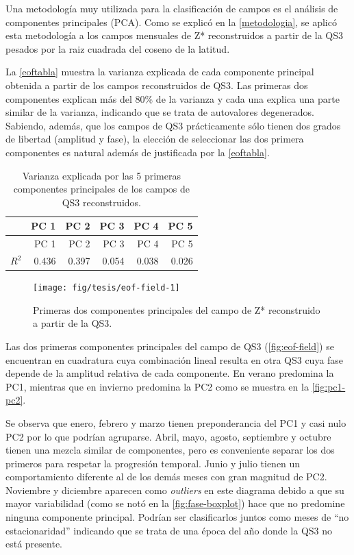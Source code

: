 \documentclass[spanish,a4paper,12pt,oneside]{book}
\begin{document}
Una metodología muy utilizada para la clasificación de campos es el
análisis de componentes principales (PCA). Como se explicó en la
\autoref{metodologia}, se aplicó esta metodología a los campos mensuales
de Z* reconstruidos a partir de la QS3 pesados por la raiz cuadrada del
coseno de la latitud.

La \autoref{eoftabla} muestra la varianza explicada de cada componente
principal obtenida a partir de los campos reconstruidos de QS3. Las
primeras dos componentes explican más del 80\% de la varianza y cada una
explica una parte similar de la varianza, indicando que se trata de
autovalores degenerados. Sabiendo, además, que los campos de QS3
prácticamente sólo tienen dos grados de libertad (amplitud y fase), la
elección de seleccionar las dos primera componentes es natural además de
justificada por la \autoref{eoftabla}.

\begin{longtable}[]{@{}lrrrrr@{}}
\caption{Varianza explicada por las 5 primeras componentes principales
de los campos de QS3 reconstruidos.\label{eoftabla}}\tabularnewline
\toprule
& PC 1 & PC 2 & PC 3 & PC 4 & PC 5\tabularnewline
\midrule
\endfirsthead
\toprule
& PC 1 & PC 2 & PC 3 & PC 4 & PC 5\tabularnewline
\midrule
\endhead
\(R^2\) & 0.436 & 0.397 & 0.054 & 0.038 & 0.026\tabularnewline
\bottomrule
\end{longtable}

\begin{figure}
\texttt{[image: fig/tesis/eof-field-1]} \caption{Primeras dos componentes principales del campo de Z* reconstruido a partir de la QS3.}\label{fig:eof-field}
\end{figure}

Las dos primeras componentes principales del campo de QS3
(\autoref{fig:eof-field}) se encuentran en cuadratura cuya combinación
lineal resulta en otra QS3 cuya fase depende de la amplitud relativa de
cada componente. En verano predomina la PC1, mientras que en invierno
predomina la PC2 como se muestra en la \autoref{fig:pc1-pc2}.

Se observa que enero, febrero y marzo tienen preponderancia del PC1 y
casi nulo PC2 por lo que podrían agruparse. Abril, mayo, agosto,
septiembre y octubre tienen una mezcla similar de componentes, pero es
conveniente separar los dos primeros para respetar la progresión
temporal. Junio y julio tienen un comportamiento diferente al de los
demás meses con gran magnitud de PC2. Noviembre y diciembre aparecen
como \emph{outliers} en este diagrama debido a que su mayor variabilidad
(como se notó en la \autoref{fig:fase-boxplot}) hace que no predomine
ninguna componente principal. Podrían ser clasificarlos juntos como
meses de ``no estacionaridad'' indicando que se trata de una época del
año donde la QS3 no está presente.
\end{document}
